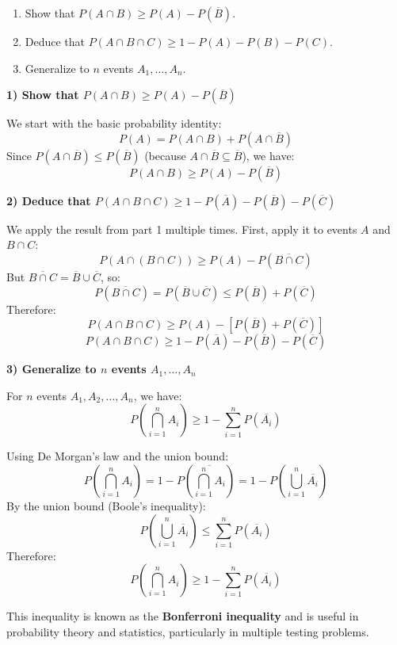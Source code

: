\documentclass[12pt]{article}
\begin{document}
\begin{enumerate}
    \item Show that $P(A \cap B) \geq P(A) - P(\overline{B})$.
    \item Deduce that $P(A \cap B \cap C) \geq 1 - P(A) - P(B) - P(C)$.
    \item Generalize to $n$ events $A_1, \ldots, A_n$.
\end{enumerate}

\begin{correctionbox}
\textbf{1) Show that $P(A \cap B) \geq P(A) - P(\overline{B})$}

We start with the basic probability identity:
\[
P(A) = P(A \cap B) + P(A \cap \overline{B})
\]
Since $P(A \cap \overline{B}) \leq P(\overline{B})$ (because $A \cap \overline{B} \subseteq \overline{B}$), we have:
\[
P(A \cap B) \geq P(A) - P(\overline{B})
\]

\textbf{2) Deduce that $P(A \cap B \cap C) \geq 1 - P(\overline{A}) - P(\overline{B}) - P(\overline{C})$}

We apply the result from part 1 multiple times. First, apply it to events $A$ and $B \cap C$:
\[
P(A \cap (B \cap C)) \geq P(A) - P(\overline{B \cap C})
\]
But $\overline{B \cap C} = \overline{B} \cup \overline{C}$, so:
\[
P(\overline{B \cap C}) = P(\overline{B} \cup \overline{C}) \leq P(\overline{B}) + P(\overline{C})
\]
Therefore:
\[
P(A \cap B \cap C) \geq P(A) - [P(\overline{B}) + P(\overline{C})]
\]
\[
P(A \cap B \cap C) \geq 1 - P(\overline{A}) - P(\overline{B}) - P(\overline{C})
\]

\textbf{3) Generalize to $n$ events $A_1, \ldots, A_n$}

For $n$ events $A_1, A_2, \ldots, A_n$, we have:
\[
P\left(\bigcap_{i=1}^n A_i\right) \geq 1 - \sum_{i=1}^n P(\overline{A_i})
\]

Using De Morgan's law and the union bound:
\[
P\left(\bigcap_{i=1}^n A_i\right) = 1 - P\left(\overline{\bigcap_{i=1}^n A_i}\right) = 1 - P\left(\bigcup_{i=1}^n \overline{A_i}\right)
\]
By the union bound (Boole's inequality):
\[
P\left(\bigcup_{i=1}^n \overline{A_i}\right) \leq \sum_{i=1}^n P(\overline{A_i})
\]
Therefore:
\[
P\left(\bigcap_{i=1}^n A_i\right) \geq 1 - \sum_{i=1}^n P(\overline{A_i})
\]

This inequality is known as the \textbf{Bonferroni inequality} and is useful in probability theory and statistics, particularly in multiple testing problems.
\end{correctionbox}

\end{document}
